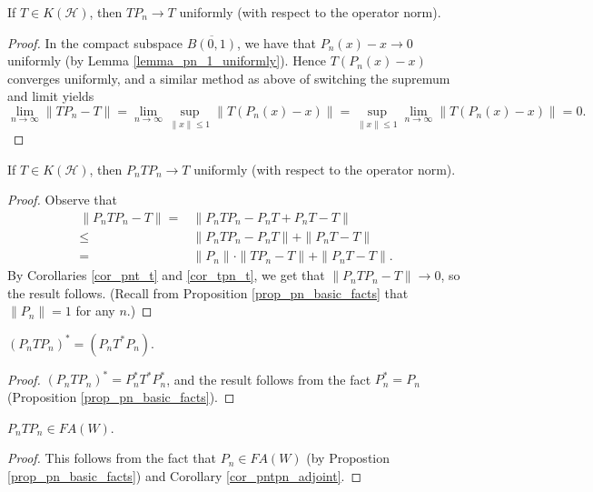 \documentclass[12pt]{article}
\begin{document}
\begin{corollary}
\label{cor_tpn_t}
	If $T\in K(\mathcal{H})$, then $TP_n\to T$ uniformly (with respect to the operator norm).
\end{corollary}
\begin{proof}
	In the compact subspace $\overline{B(0,1)}$, we have that $P_n(x)-x\to 0$ uniformly (by Lemma \ref{lemma_pn_1_uniformly}). Hence $T(P_n(x)-x)$ converges uniformly, and a similar method as above of switching the supremum and limit yields 
	\begin{equation*}
		\lim_{n\to\infty}\|TP_n-T\|=\lim_{n\to\infty}\sup_{\|x\|\leq 1}\|T(P_n(x)-x)\|=\sup_{\|x\|\leq 1}\lim_{n\to\infty}\|T(P_n(x)-x)\|=0.
	\end{equation*}
\end{proof}

\begin{corollary}
\label{cor_pntpn_t}
	If $T\in K(\mathcal{H})$, then $P_nTP_n\to T$ uniformly (with respect to the operator norm).
\end{corollary}
\begin{proof}
	Observe that
	\begin{align*}
		\|P_nTP_n - T\| =& \|P_nTP_n - P_nT + P_nT - T\| \\
		\leq & \|P_nTP_n - P_nT\| + \|P_nT - T\| \\
		=& \|P_n\|\cdot\|TP_n-T\| + \|P_nT-T\|. 
	\end{align*}
	By Corollaries \ref{cor_pnt_t} and \ref{cor_tpn_t}, we get that $\|P_nTP_n-T\|\to 0$, so the result follows. (Recall from Proposition \ref{prop_pn_basic_facts} that $\|P_n\|=1$ for any $n$.)
\end{proof}

\begin{corollary}
\label{cor_pntpn_adjoint}
	$(P_nTP_n)^\ast = (P_n T^\ast P_n)$.
\end{corollary}
\begin{proof}
	$(P_nTP_n)^\ast = P_n^\ast T^\ast P_n^\ast$, and the result follows from the fact $P_n^\ast=P_n$ (Proposition \ref{prop_pn_basic_facts}).
\end{proof}

\begin{corollary}
\label{cor_pntpn_in_jaw}
	$P_nTP_n\in FA(W)$.
\end{corollary}
\begin{proof}
	This follows from the fact that $P_n\in FA(W)$ (by Propostion \ref{prop_pn_basic_facts}) and Corollary \ref{cor_pntpn_adjoint}.
\end{proof}
\end{document}
